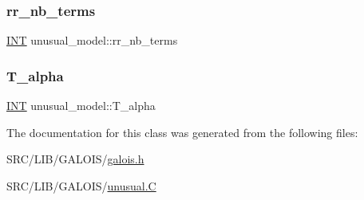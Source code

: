 \subsubsection{\texorpdfstring{rr\+\_\+nb\+\_\+terms}{rr\_nb\_terms}}
{\footnotesize\ttfamily \mbox{\hyperlink{galois_8h_a09fddde158a3a20bd2dcadb609de11dc}{I\+NT}} unusual\+\_\+model\+::rr\+\_\+nb\+\_\+terms}

\mbox{\label{classunusual__model_a70d74cbb2645b3d70aabae2c8996e79e}} 
\subsubsection{\texorpdfstring{T\+\_\+alpha}{T\_alpha}}
{\footnotesize\ttfamily \mbox{\hyperlink{galois_8h_a09fddde158a3a20bd2dcadb609de11dc}{I\+NT}} unusual\+\_\+model\+::\+T\+\_\+alpha}



The documentation for this class was generated from the following files\+:\begin{DoxyCompactItemize}
\item 
S\+R\+C/\+L\+I\+B/\+G\+A\+L\+O\+I\+S/\mbox{\hyperlink{galois_8h}{galois.\+h}}\item 
S\+R\+C/\+L\+I\+B/\+G\+A\+L\+O\+I\+S/\mbox{\hyperlink{unusual_8_c}{unusual.\+C}}\end{DoxyCompactItemize}
